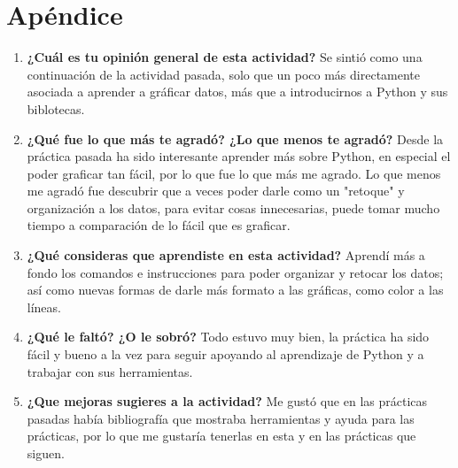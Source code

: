 \documentclass[a4paper]{article}
\begin{document}
\section{Apéndice}
\begin{enumerate}
\item \textbf{¿Cuál es tu opinión general de esta actividad?}
Se sintió como una continuación de la actividad pasada, solo que un poco más directamente asociada a aprender a gráficar datos, más que a introducirnos a Python y sus biblotecas.
\item \textbf{¿Qué fue lo que más te agradó? ¿Lo que menos te agradó?}
Desde la práctica pasada ha sido interesante aprender más sobre Python, en especial el poder graficar tan fácil, por lo que fue lo que más me agrado. Lo que menos me agradó fue descubrir que a veces poder darle como un "retoque" y organización a los datos, para evitar cosas innecesarias, puede tomar mucho tiempo a comparación de lo fácil que es graficar. 
\item \textbf{¿Qué consideras que aprendiste en esta actividad?}
Aprendí más a fondo los comandos e instrucciones para poder organizar y retocar los datos; así como nuevas formas de darle más formato a las gráficas, como color a las líneas.  
\item \textbf{¿Qué le faltó? ¿O le sobró?}
Todo estuvo muy bien, la práctica ha sido fácil y bueno a la vez para seguir apoyando al aprendizaje de Python y a trabajar con sus herramientas.
\item \textbf{¿Que mejoras sugieres a la actividad?}
Me gustó que en las prácticas pasadas había bibliografía que mostraba herramientas y ayuda para las prácticas, por lo que me gustaría tenerlas en esta y en las prácticas que siguen. 
\end{enumerate}
\end{document}
